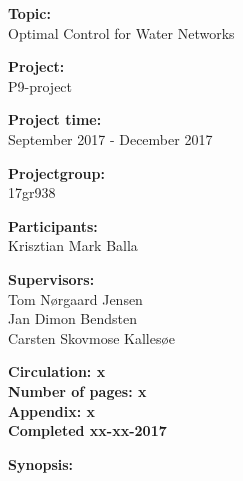 \begin{minipage}[t]{0.48\textwidth}
\textbf{Topic:} \\[5pt]\bigskip\hspace{2ex}
Optimal Control for Water Networks

\textbf{Project:} \\[5pt]\bigskip\hspace{2ex}
P9-project

\textbf{Project time:} \\[5pt]\bigskip\hspace{2ex}
September 2017 - December 2017

\textbf{Projectgroup:} \\[5pt]\bigskip\hspace{2ex}
17gr938	

\textbf{Participants:} \\[5pt]\hspace*{2ex}
Krisztian Mark Balla \\\hspace*{2ex}

\textbf{Supervisors:} \\[5pt]\hspace*{2ex}
Tom Nørgaard Jensen \\\hspace*{2ex}
Jan Dimon Bendsten \\\hspace*{2ex}
Carsten Skovmose Kallesøe \\\bigskip\hspace{2ex}

\vspace*{3.5cm}

\textbf{Circulation: x} \\
\textbf{Number of pages: x}\\
\textbf{Appendix: x } \\
\textbf{Completed xx-xx-2017}\\
\end{minipage}
\hfill
\begin{minipage}[t]{0.483\textwidth}
\textbf{Synopsis:} \\[5pt]
\fbox{\parbox{7cm}{\bigskip\bigskip}}
\end{minipage}

\vfill